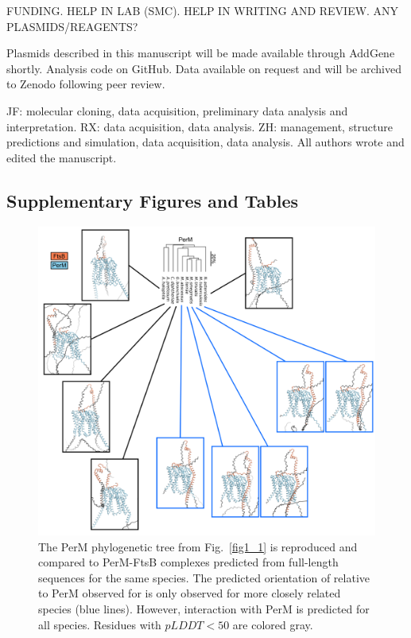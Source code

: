 \documentclass[pdflatex,sn-basic]{sn-jnl}%
\begin{document}
\loremipsum{}

\backmatter


FUNDING. HELP IN LAB (SMC). HELP IN WRITING AND REVIEW. ANY PLASMIDS/REAGENTS?

Plasmids described in this manuscript will be made available through AddGene shortly.
Analysis code on GitHub.
Data available on request and will be archived to Zenodo following peer review.


JF: molecular cloning, data acquisition, preliminary data analysis and interpretation. RX: data acquisition, data analysis. ZH: management, structure predictions and simulation, data acquisition, data analysis. All authors wrote and edited the manuscript.


\begin{appendices}

\section{Supplementary Figures and Tables}

\begin{figure}[h]
\centering
\includegraphics[width=1.0\textwidth]{../figures/figS1.png}
\caption{The PerM phylogenetic tree from Fig.~\ref{fig1_1} is reproduced and compared to PerM-FtsB complexes predicted from full-length sequences for the same species. The predicted orientation of \ftsbTM{} relative to PerM observed for \mtb{} is only observed for more closely related species (blue lines). However, \ftsbH{} interaction with PerM is predicted for all species. Residues with $pLDDT<50$ are colored gray.}\label{figS1}
\end{figure}

\end{appendices}
\end{document}
